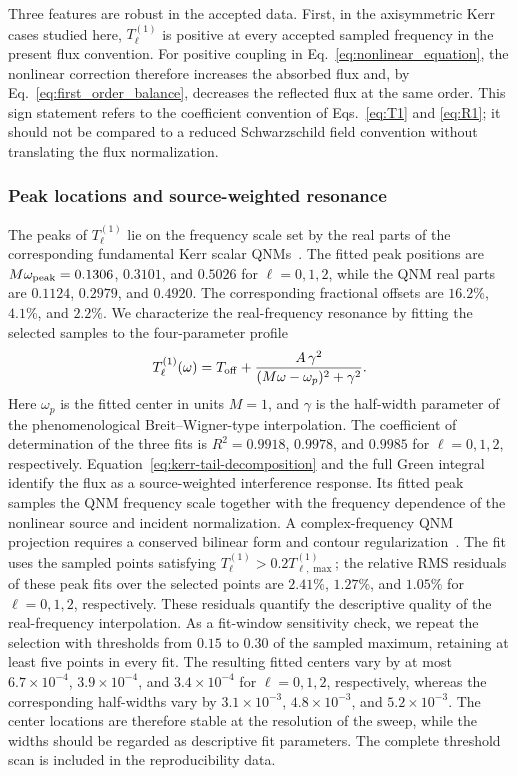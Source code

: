 \documentclass[aps,prd,twocolumn,10pt,nofootinbib,superscriptaddress,floatfix]{revtex4-2}
\begin{document}
Three features are robust in the accepted data.  First, in the axisymmetric
Kerr cases studied here, $T_\ell^{(1)}$ is positive at every accepted sampled
frequency in the present flux
convention.  For positive coupling in Eq.~\eqref{eq:nonlinear_equation}, the
nonlinear correction therefore increases the absorbed flux and, by
Eq.~\eqref{eq:first_order_balance}, decreases the reflected flux at the same
order.  This sign statement refers to the coefficient convention of
Eqs.~\eqref{eq:T1} and \eqref{eq:R1}; it should not be compared to a reduced
Schwarzschild field convention without translating the flux normalization.

\subsubsection{Peak locations and source-weighted resonance}

The peaks of $T_\ell^{(1)}$ lie on the frequency scale set by the real
parts of the corresponding fundamental Kerr scalar QNMs~\cite{Berti2009,Stein2019}.  The fitted peak
positions are $M\omega_{\rm peak}=0.1306$, $0.3101$, and $0.5026$ for
$\ell=0,1,2$, while the QNM real parts are $0.1124$, $0.2979$, and $0.4920$.
The corresponding fractional offsets are $16.2\%$, $4.1\%$, and
$2.2\%$.
We characterize the real-frequency resonance by fitting the selected
samples to the four-parameter profile
\begin{equation}
T_\ell^{(1)}(\omega)=T_{\rm off}+
\frac{A\,\gamma^2}{(M\omega-\omega_p)^2+\gamma^2} .
\label{eq:lorentzian}
\end{equation}
Here $\omega_p$ is the fitted center in units $M=1$, and $\gamma$ is the
half-width parameter of the phenomenological Breit--Wigner-type interpolation.
The coefficient of determination of the three fits is $R^2=0.9918$,
$0.9978$, and $0.9985$ for $\ell=0,1,2$, respectively.
Equation~\eqref{eq:kerr-tail-decomposition} and the full Green integral
identify the flux as a source-weighted interference response.
Its fitted peak samples the QNM frequency scale together with the
frequency dependence of the nonlinear source and incident normalization.
A complex-frequency QNM projection requires a conserved bilinear form
and contour regularization~\cite{GreenEtAl2023}.
The fit uses the sampled points satisfying $T_\ell^{(1)}>0.2T_{\ell,\max}^{(1)}$;
the relative RMS residuals of these peak fits over the selected points are
$2.41\%$, $1.27\%$, and $1.05\%$ for $\ell=0,1,2$, respectively.  These
residuals quantify the descriptive quality of the real-frequency interpolation.
As a fit-window sensitivity check, we repeat the selection with thresholds
from $0.15$ to $0.30$ of the sampled maximum, retaining at least five points
in every fit.  The resulting fitted centers vary by at most
$6.7\times10^{-4}$, $3.9\times10^{-4}$, and $3.4\times10^{-4}$ for
$\ell=0,1,2$, respectively, whereas the corresponding half-widths vary by
$3.1\times10^{-3}$, $4.8\times10^{-3}$, and $5.2\times10^{-3}$.  The
center locations are therefore stable at the resolution of the sweep, while
the widths should be regarded as descriptive fit parameters.  The complete
threshold scan is included in the reproducibility data.
\end{document}
